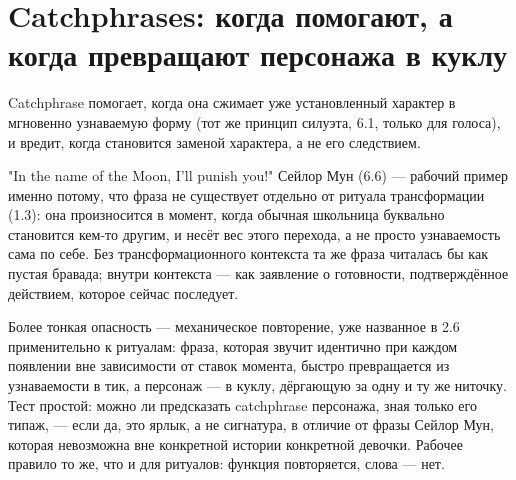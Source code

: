 \section{Catchphrases: когда помогают, а когда превращают персонажа в куклу}

Catchphrase помогает, когда она сжимает уже установленный характер в мгновенно узнаваемую форму (тот же принцип силуэта, 6.1, только для голоса), и вредит, когда становится заменой характера, а не его следствием.

"In the name of the Moon, I'll punish you!" Сейлор Мун (6.6) — рабочий пример именно потому, что фраза не существует отдельно от ритуала трансформации (1.3): она произносится в момент, когда обычная школьница буквально становится кем-то другим, и несёт вес этого перехода, а не просто узнаваемость сама по себе. Без трансформационного контекста та же фраза читалась бы как пустая бравада; внутри контекста — как заявление о готовности, подтверждённое действием, которое сейчас последует.

Более тонкая опасность — механическое повторение, уже названное в 2.6 применительно к ритуалам: фраза, которая звучит идентично при каждом появлении вне зависимости от ставок момента, быстро превращается из узнаваемости в тик, а персонаж — в куклу, дёргающую за одну и ту же ниточку. Тест простой: можно ли предсказать catchphrase персонажа, зная только его типаж, — если да, это ярлык, а не сигнатура, в отличие от фразы Сейлор Мун, которая невозможна вне конкретной истории конкретной девочки. Рабочее правило то же, что и для ритуалов: функция повторяется, слова — нет.
